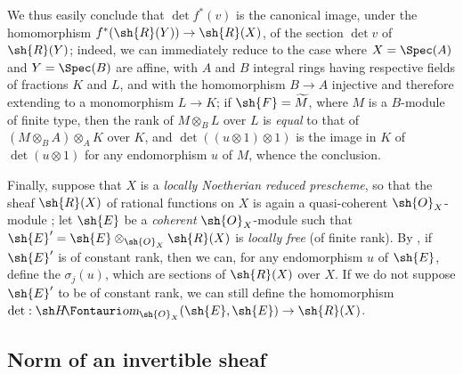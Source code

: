 \begin{env}[6.4.9]
We thus easily conclude that $\det f^*(v)$ is the canonical image, under the homomorphism $f^*(\sh{R}(Y))\to\sh{R}(X)$, of the section $\det v$ of $\sh{R}(Y)$;
indeed, we can immediately reduce to the case where $X=\Spec(A)$ and $Y=\Spec(B)$ are affine, with $A$ and $B$ integral rings having respective fields of fractions $K$ and $L$, and with the homomorphism $B\to A$ injective and therefore extending to a monomorphism $L\to K$;
if $\sh{F}=\widetilde{M}$, where $M$ is a $B$-module of finite type, then the rank of $M\otimes_B L$ over $L$ is \emph{equal} to that of $(M\otimes_B A)\otimes_A K$ over $K$, and $\det((u\otimes1)\otimes1)$ is the image in $K$ of $\det(u\otimes1)$ for any endomorphism $u$ of $M$, whence the conclusion.
\end{env}

\begin{env}[6.4.10]
\label{II.6.4.10}
Finally, suppose that $X$ is a \emph{locally Noetherian reduced prescheme}, so that the sheaf $\sh{R}(X)$ of rational functions on $X$ is again a quasi-coherent $\sh{O}_X$-module ;
let $\sh{E}$ be a \emph{coherent} $\sh{O}_X$-module such that $\sh{E}'=\sh{E}\otimes_{\sh{O}_X}\sh{R}(X)$ is \emph{locally free} (of finite rank).
By , if $\sh{E}'$ is of constant rank, then we can, for any endomorphism $u$ of $\sh{E}$, define the $\sigma_j(u)$, which are sections of $\sh{R}(X)$ over $X$.
If we do not suppose $\sh{E}'$ to be of constant rank, we can still define the homomorphism $\det:\shHom_{\sh{O}_X}(\sh{E},\sh{E})\to\sh{R}(X)$.
\end{env}


\subsection{Norm of an invertible sheaf}
\label{subsection:II.6.5}

